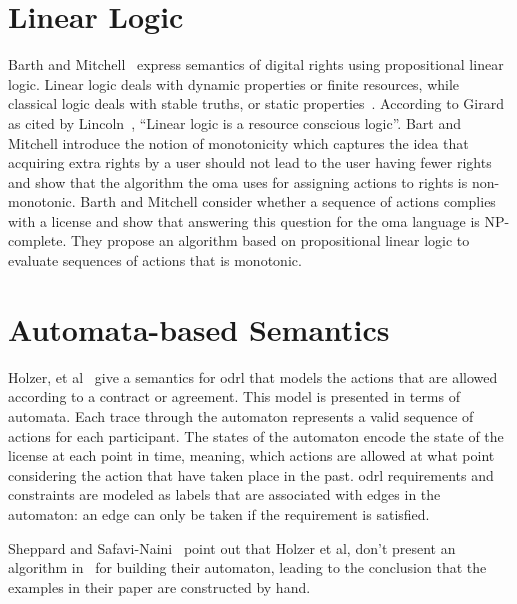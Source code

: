 \section{Linear Logic}

Barth and Mitchell~\cite{BarthM06} express semantics of digital rights using propositional linear logic. Linear logic deals with dynamic properties or finite resources, while classical logic deals with stable truths, or static properties~\cite{Girard87}. According to Girard as cited by Lincoln~\cite{Lincoln}, ``Linear logic is a resource conscious logic''. Bart and Mitchell introduce the notion of monotonicity which captures the idea that acquiring extra rights by a user should not lead to the user having fewer rights and show that the algorithm the \ac{oma} uses for assigning actions to rights is non-monotonic. Barth and Mitchell consider whether a sequence of actions complies with a license and show that answering this question for the \ac{oma} language is NP-complete. They propose an algorithm based on propositional linear logic to evaluate sequences of actions that is monotonic.

\section{Automata-based Semantics}
Holzer, et al~\cite{HolzerKS04} give a semantics for \ac{odrl} that models the actions that are allowed according to a contract or agreement. This model is presented in terms of automata. Each trace through the automaton represents a valid sequence of actions for each participant. The states of the automaton encode the state of the license at each point in time, meaning, which actions are allowed at what point considering the action that have taken place in the past. \ac{odrl} requirements and constraints are modeled as labels that are associated with edges in the automaton: an edge can only be taken if the requirement is satisfied. 

Sheppard and Safavi-Naini~\cite{SheppardS09} point out that Holzer et al, don't present an algorithm in~\cite{HolzerKS04} for building their automaton, leading to the conclusion that the examples in their paper are constructed by hand.

